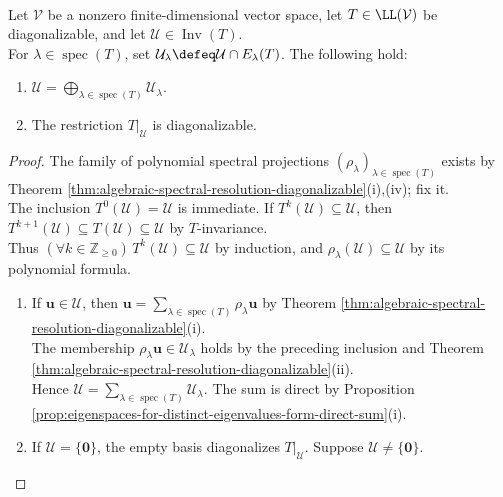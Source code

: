 \begin{lemma} \label{lem:diagonalizable-restriction-to-invariant-subspace} \\
Let $\mathcal{V}$ be a nonzero finite-dimensional vector space, let $T\in\LL(\mathcal{V})$ be diagonalizable, and let $\mathcal{U}\in\operatorname{Inv}(T)$.\\
For $\lambda\in\operatorname{spec}(T)$, set $\mathcal{U}_{\lambda}\defeq\mathcal{U}\cap E_{\lambda}(T)$. The following hold:
\begin{enumerate}[label=(\roman*)]
\setlength{\itemsep}{0pt}
\item $\mathcal{U}=\bigoplus\limits_{\lambda\in\operatorname{spec}(T)}\mathcal{U}_{\lambda}$.
\item The restriction $T|_{\mathcal{U}}$ is diagonalizable.
\end{enumerate}
\begin{proof}
The family of polynomial spectral projections $(\rho_{\lambda})_{\lambda\in\operatorname{spec}(T)}$ exists by Theorem \ref{thm:algebraic-spectral-resolution-diagonalizable}(i),(iv); fix it.\\
The inclusion $T^0(\mathcal{U})=\mathcal{U}$ is immediate. If $T^k(\mathcal{U})\subseteq\mathcal{U}$, then $T^{k+1}(\mathcal{U})\subseteq T(\mathcal{U})\subseteq\mathcal{U}$ by $T$-invariance.\\
Thus $(\forall k\in\mathbb{Z}_{\geq0})\,T^k(\mathcal{U})\subseteq\mathcal{U}$ by induction, and $\rho_{\lambda}(\mathcal{U})\subseteq\mathcal{U}$ by its polynomial formula.
\begin{enumerate}[label=(\roman*)]
\setlength{\itemsep}{0pt}
\item If $\mathbf{u}\in\mathcal{U}$, then $\mathbf{u}=\sum\limits_{\lambda\in\operatorname{spec}(T)}\rho_{\lambda}\mathbf{u}$ by Theorem \ref{thm:algebraic-spectral-resolution-diagonalizable}(i).\\
The membership $\rho_{\lambda}\mathbf{u}\in\mathcal{U}_{\lambda}$ holds by the preceding inclusion and Theorem \ref{thm:algebraic-spectral-resolution-diagonalizable}(ii).\\
Hence $\mathcal{U}=\sum\limits_{\lambda\in\operatorname{spec}(T)}\mathcal{U}_{\lambda}$. The sum is direct by Proposition \ref{prop:eigenspaces-for-distinct-eigenvalues-form-direct-sum}(i).
\item If $\mathcal{U}=\{\mathbf{0}\}$, the empty basis diagonalizes $T|_{\mathcal{U}}$. Suppose $\mathcal{U}\neq\{\mathbf{0}\}$.\\

\end{enumerate}
\end{proof}
\end{lemma}
